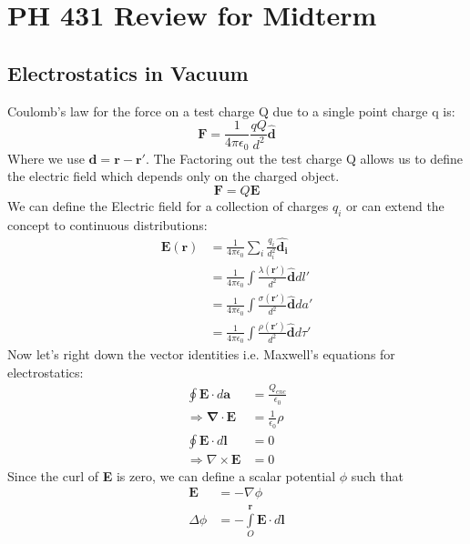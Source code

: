 \documentclass[a4paper, 11pt]{article}
\begin{document}
\section*{PH 431 Review for Midterm}	
	\subsection*{Electrostatics in Vacuum}
		Coulomb's law for the force on a test charge Q due to a single point charge q is: 
			\begin{equation}
				\mathbf{F} = \frac{1}{4\pi\epsilon_0}\frac{qQ}{d^2}\hat{\mathbf{d}}
			\end{equation} 
		Where we use $\mathbf{d} = \mathbf{r-r'}$. The Factoring out the test charge Q allows us to define the electric field which depends only on the charged object. 
			\begin{equation}
				\mathbf{F} = Q \mathbf{E} 
			\end{equation} 
		We can define the Electric field for a collection of charges $q_i$ or can extend the concept to continuous distributions: 
			\begin{align}
				\mathbf{E(r)} 	&= \frac{1}{4\pi\epsilon_0}\sum\limits_i \frac{q_i}{d_i^2}\hat{\mathbf{d_i}} \\ 	
								&= \frac{1}{4\pi\epsilon_0}\int \frac{\lambda(\mathbf{r'})}{d^2}\hat{\mathbf{d}} dl'\\
								&= \frac{1}{4\pi\epsilon_0}\int \frac{\sigma(\mathbf{r'})}{d^2}\hat{\mathbf{d}}da' \\ 
								&= \frac{1}{4\pi\epsilon_0}\int \frac{\rho(\mathbf{r'})}{d^2}\hat{\mathbf{d}}d\tau' 
			\end{align}
		Now let's right down the vector identities i.e. Maxwell's equations for electrostatics: 
			\begin{align}
				\oint \mathbf{E} \cdot d\mathbf{a} &= \frac{Q_{enc}}{\epsilon_0} \\ 
				\Rightarrow \mathbf{\nabla} \cdot \mathbf{E} &= \frac{1}{\epsilon_0} \rho \\
				\oint \mathbf{E} \cdot d\mathbf{l} &= 0 \\ 
				\Rightarrow \nabla \times \mathbf{E} &= 0 
			\end{align}
		Since the curl of \textbf{E} is zero, we can define a scalar potential $\phi$ such that 
			\begin{align}
				\mathbf{E} &= -\nabla \phi \\ 
				\Delta \phi &= - \int \limits_O^\mathbf{r} \mathbf{E} \cdot d\mathbf{l} 
			\end{align}
\end{document}
